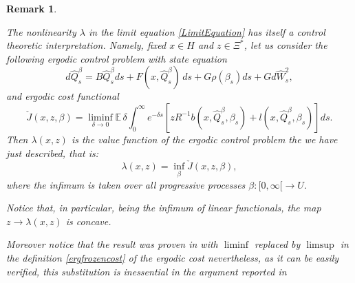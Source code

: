 \documentclass[reqno,a4paper,11 pt]{article}
\def \E {\mathbb{E}}
\def \e {\varepsilon}
\newtheorem{remark}[theorem]{Remark}
\numberwithin{equation}{section}
\begin{document}

\begin{remark} \label{rem-lambdacontrol}
{\em The nonlinearity $\lambda$ in the limit equation \eqref{LimitEquation} has itself a control theoretic interpretation. 
Namely, fixed $x\in H$ and $z\in \Xi^*$, let us consider the following ergodic control problem with {\em state equation}
\begin{equation}\label{ergfrozenstate}
d \hat{Q}^{\beta}_s=B\hat{Q}^{\beta}_sds+ F(x, \hat{Q}^{\beta}_s)\, d s + G\rho(\beta_s) d s +  G d\hat {W}^2_s,
\end{equation}
and {\em ergodic cost functional} 
\begin{equation}\label{ergfrozencost}
 \check{J}(x,z,\beta)=\liminf_{\delta \to 0} \E \, \delta \int_0^{\infty} e^{-\delta s} [z R^{-1}b(x, \hat{Q}^{\beta}_s,\beta_s)+ l(x,\hat{Q}^{\beta}_s,\beta_s)] d s.
\end{equation}
Then $\lambda(x,z)$ is the value function of the ergodic control problem the we have just described, that is:
$$\lambda(x,z)=\inf_{\beta}  \check{J}(x,z,\beta),$$
where the infimum is taken over all progressive processes ${\beta}: [0,\infty[\rightarrow U$.
\smallskip

\noindent
Notice that, in particular, being the infimum of linear functionals, the map $z\rightarrow \lambda(x,z)$ is concave.
\smallskip

\noindent Moreover notice that the result was proven in \cite{FuHuTes} with $\liminf$ replaced by $\limsup$ in the definition \eqref{ergfrozencost} of the ergodic cost nevertheless, as it can be easily verified, this substitution is inessential in the argument reported in  \cite{FuHuTes}
}\end{remark}
\end{document}
